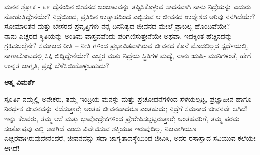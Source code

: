 \begin{mananam}{\mananamfont \large ಮನನ ಶ್ಲೋಕ - ೬೯}
\footnotesize \mananamtext ದೈನಂದಿನ ಜೀವನದ ಜಂಜಾಟವನ್ನು ತಪ್ಪಿಸಿಕೊಳ್ಳುವ ಸಾಧನವಾಗಿ ನಾನು ನಿದ್ರೆಯನ್ನು ಎದುರು ನೋಡುತ್ತಿದ್ದೇನೆಯೇ? ನಿದ್ರೆಯಿಂದ, ಪ್ರತಿದಿನ ಉತ್ಸಾಹದಿಂದ ಎಬ್ಬಿಸುವ ಆ  ಜೀವನದ ಉದ್ದೇಶದ ಅರಿವು ನನಗಿದೆಯೇ?  ಸೋಮಾರಿತನ ಮತ್ತು ಬೇಸರದ ಪ್ರವೃತ್ತಿಗಳು ನನ್ನ ದಿನನಿತ್ಯದ ಜೀವನದ ಮೇಲೆ ಪ್ರಾಬಲ್ಯ ಹೊಂದಿವೆಯೇ?\\
ನಾನು ಎಚ್ಚರದ ಸ್ಥಿತಿಯನ್ನು ಅಂತಿಮ ವಾಸ್ತವವೆಂದು ಪರಿಗಣಿಸುತ್ತೇನೆಯೇ ಅಥವಾ, ಇದಕ್ಕಿಂತ ಹೆಚ್ಚಿನದನ್ನು ಗ್ರಹಿಸಬಲ್ಲೆನೇ? ಸಮಾಜದ ರೀತಿ – ನೀತಿ ಗಳಿಂದ ಪ್ರಭಾವಿತವಾಗಿರುವ ಜೀವನದ ಕೊನೆ ಮೊದಲಿಲ್ಲದ ಸ್ಪರ್ಧೆಯಲ್ಲಿ, ನಾಗಾಲೋಟದಲ್ಲಿ ಸಿಕ್ಕಿ ಬಿದ್ದಿದ್ದೇನೆಯೇ? ಎಚ್ಚರ ಮತ್ತು ನಿದ್ರೆಯ  ಸ್ಥಿತಿಗಳ  ಮಧ್ಯೆ,  ನಾನು ಋಷಿ- ಮುನಿಗಳಂತೆ,  ಹೇಗೆ ಉನ್ನತ ಜಾಗೃತಿ, ಪ್ರಜ್ಞೆ ಬೆಳೆಸಿಯಿಕೊಳ್ಳಬಹುದು?

\end{mananam}
\WritingHand\enspace\textbf{ಆತ್ಮ ವಿಮರ್ಶೆ}
\begin{inspiration}{\mananamfont \large ಸ್ಪೂರ್ತಿ}
\footnotesize \mananamtext ನಮ್ಮಲ್ಲಿ ಅನೇಕರು, ತಮ್ಮ ಇಂದ್ರಿಯ ಮನಸ್ಸು ಮತ್ತು ಪ್ರಚೋದನೆಗಳಿಂದ ಸೆಳೆಯಲ್ಪಟ್ಟ, ಪ್ರಜ್ಞಾಹೀನ ಹಾಗೂ ನಿರರ್ಥಕ   ಜೀವನವನ್ನು ನಡೆಸುತ್ತಾರೆ; ಅಂತಹ ಜೀವನವಾದರೂ ಎಂತಹುದು; ನಿದ್ರೆಗೆ ಸಮನಾದ ಜೀವನವೇ ಆಗಿದೆ! ಇನ್ನು ಕೆಲವರು, ತಮ್ಮ ಆಸೆ ಮತ್ತು ಭಾವೋದ್ರೇಕಗಳಿಂದ ಪ್ರೇರೇಪಿಸಲ್ಪಟ್ಟಿರುತ್ತಾರೆ; ಅಂತಹವರಿಗೆ, ತಮ್ಮ ಪರಮ ಸಂತೋಷವು ಎಲ್ಲಿ ಅಡಗಿದೆ ಎಂದು ವಿವೇಚಿಸುವ ಶಕ್ತಿಯೂ ಇರುವುದಿಲ್ಲ. ನಿಜವಾಗಿಯೂ ಎಚ್ಚರವಾಗಿರುವುದೇನೆಂದರೆ, ಜೀವನವನ್ನು ಸದಾ ಜಾಗೃತಾವಸ್ಥೆಯಿಂದ ಜೀವಿಸಿ, ಅದರ ರಸಾಸ್ವಾದ  ಸವಿಯುವ ಕಲೆಯೇ ಆಗಿದೆ!
\end{inspiration}
\newpage


